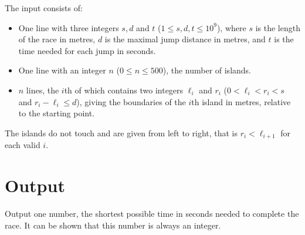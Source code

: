 The input consists of:
\begin{itemize}
  \item One line with three integers $s,d$ and $t$ ($1 \le s,d,t \le 10^9$), where
    $s$ is the length of the race in metres,
    $d$ is the maximal jump distance in metres,
    and $t$ is the time needed for each jump in seconds.
  \item One line with an integer $n$ ($0 \le n \le 500$), the number of islands.
  \item $n$ lines, the $i$th of which contains two integers $\ell_i$ and $r_i$
    ($0 < \ell_i < r_i < s$ and $r_i-\ell_i \le d$), giving the boundaries of
    the $i$th island in metres, relative to the starting point.
\end{itemize}

The islands do not touch and are given from left to right,
that is $r_i < \ell_{i+1}$ for each valid $i$.

\vspace{-2mm}
\section*{Output}

Output one number, the shortest possible time in seconds needed to complete the race.
It can be shown that this number is always an integer.

